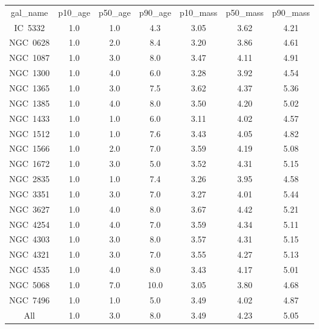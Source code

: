 \begin{table}
\begin{tabular}{ccccccc}
gal_name & p10_age & p50_age & p90_age & p10_mass & p50_mass & p90_mass \\
IC~5332 & 1.0 & 1.0 & 4.3 & 3.05 & 3.62 & 4.21 \\
NGC~0628 & 1.0 & 2.0 & 8.4 & 3.20 & 3.86 & 4.61 \\
NGC~1087 & 1.0 & 3.0 & 8.0 & 3.47 & 4.11 & 4.91 \\
NGC~1300 & 1.0 & 4.0 & 6.0 & 3.28 & 3.92 & 4.54 \\
NGC~1365 & 1.0 & 3.0 & 7.5 & 3.62 & 4.37 & 5.36 \\
NGC~1385 & 1.0 & 4.0 & 8.0 & 3.50 & 4.20 & 5.02 \\
NGC~1433 & 1.0 & 1.0 & 6.0 & 3.11 & 4.02 & 4.57 \\
NGC~1512 & 1.0 & 1.0 & 7.6 & 3.43 & 4.05 & 4.82 \\
NGC~1566 & 1.0 & 2.0 & 7.0 & 3.59 & 4.19 & 5.08 \\
NGC~1672 & 1.0 & 3.0 & 5.0 & 3.52 & 4.31 & 5.15 \\
NGC~2835 & 1.0 & 1.0 & 7.4 & 3.26 & 3.95 & 4.58 \\
NGC~3351 & 1.0 & 3.0 & 7.0 & 3.27 & 4.01 & 5.44 \\
NGC~3627 & 1.0 & 4.0 & 8.0 & 3.67 & 4.42 & 5.21 \\
NGC~4254 & 1.0 & 4.0 & 7.0 & 3.59 & 4.34 & 5.11 \\
NGC~4303 & 1.0 & 3.0 & 8.0 & 3.57 & 4.31 & 5.15 \\
NGC~4321 & 1.0 & 3.0 & 7.0 & 3.55 & 4.27 & 5.13 \\
NGC~4535 & 1.0 & 4.0 & 8.0 & 3.43 & 4.17 & 5.01 \\
NGC~5068 & 1.0 & 7.0 & 10.0 & 3.05 & 3.80 & 4.68 \\
NGC~7496 & 1.0 & 1.0 & 5.0 & 3.49 & 4.02 & 4.87 \\
All & 1.0 & 3.0 & 8.0 & 3.49 & 4.23 & 5.05 \\
\end{tabular}
\end{table}
